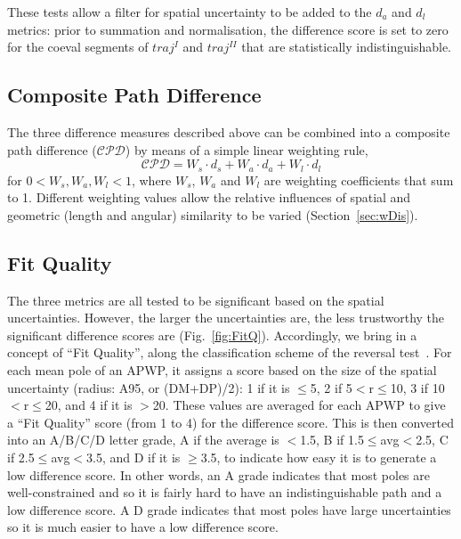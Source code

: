 These tests allow a filter for spatial uncertainty to be added to the $d_a$ and
$d_l$ metrics: prior to summation and normalisation, the difference score is set
to zero for the coeval segments of $traj^I$ and $traj^{II}$ that are
statistically indistinguishable.

\subsection{Composite Path Difference}

The three difference measures described above can be combined into a composite
path difference ($\mathcal{CPD}$) by means of a simple linear weighting rule,
%
\begin{equation*}
\mathcal{CPD} = W_s \cdot d_s + W_a \cdot d_a + W_l \cdot d_l
\label{eq:cpd}
\end{equation*}
%
for $0 < W_s,W_a,W_l < 1$, where $W_s$, $W_a$ and $W_l$ are weighting
coefficients that sum to 1. Different weighting values allow the relative
influences of spatial and geometric (length and angular) similarity to be
varied (Section~\ref{sec:wDis}).

\subsection{Fit Quality}\label{sec:FQ}

The three metrics are all tested to be significant based on the spatial
uncertainties. However, the larger the uncertainties are, the less trustworthy
the significant difference scores are (Fig.~\ref{fig:FitQ}). Accordingly, we
bring in a concept of ``Fit Quality'', along the classification scheme of the
reversal test~\citep{M90}. For each mean pole of an APWP, it assigns a score
based on the size of the spatial uncertainty (radius: A95, or (DM+DP)/2): 1 if
it is $\leq$5\degree, 2 if 5\degree$<$r$\leq$10\degree, 3 if
10\degree$<$r$\leq$20\degree, and 4 if it is $>$20\degree. These values are
averaged for each APWP to give a ``Fit Quality'' score (from 1 to 4) for the
difference score. This is then converted into an A/B/C/D letter grade, A if the
average is $<$1.5, B if 1.5$\leq$avg$<$2.5, C if 2.5$\leq$avg$<$3.5, and D if it
is $\geq$3.5, to indicate how easy it is to generate a low difference score. In
other words, an A grade indicates that most poles are well-constrained and so it
is fairly hard to have an indistinguishable path and a low difference score. A D
grade indicates that most poles have large uncertainties so it is much easier to
have a low difference score.


